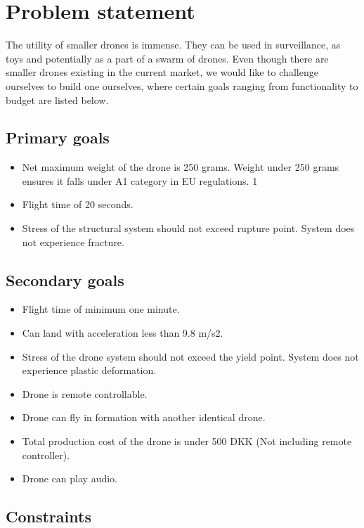 \section{Problem statement}
The utility of smaller drones is immense. They can be used in surveillance, as toys and potentially as a part of a swarm of drones. Even though there are smaller drones existing in the current market, we would like to challenge ourselves to build one ourselves, where certain goals ranging from functionality to budget are listed below.
\subsection{Primary goals }
\begin{itemize}
    \item
          Net maximum weight of the drone is 250 grams. Weight under 250 grams ensures it falls under A1 category in EU regulations. 1
    \item
          Flight time of 20 seconds.
    \item
          Stress of the structural system should not exceed rupture point. System does not experience fracture.
\end{itemize}


\subsection{Secondary goals}
\begin{itemize}
    \item
          Flight time of minimum one minute.
    \item
          Can land with acceleration less than 9.8 m/s2.
    \item
          Stress of the drone system should not exceed the yield point. System does not experience plastic deformation.
    \item
          Drone is remote controllable.
    \item
          Drone can fly in formation with another identical drone.
    \item
          Total production cost of the drone is under 500 DKK (Not including remote controller).
    \item
          Drone can play audio.
\end{itemize}



\subsection{Constraints}


